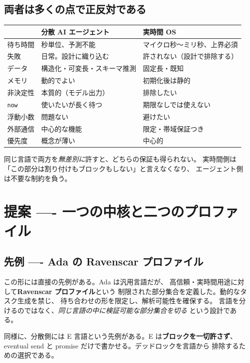 \documentclass[11pt,a4paper]{ltjsarticle}
\theoremstyle{remark}
\begin{document}
\subsection{両者は多くの点で正反対である}

\begin{center}
\small
\begin{tabular}{@{}lll@{}}
\toprule
 & 分散 AI エージェント & 実時間 OS \\
\midrule
待ち時間        & 秒単位、予測不能 & マイクロ秒〜ミリ秒、上界必須 \\
失敗            & 日常。設計に織り込む & 許されない（設計で排除する） \\
データ          & 構造化・可変長・スキーマ推測 & 固定長・既知 \\
メモリ          & 動的でよい & 初期化後は静的 \\
非決定性        & 本質的（モデル出力） & 排除したい \\
\texttt{now}    & 使いたいが長く待つ & 期限なしでは使えない \\
浮動小数        & 問題ない & 避けたい \\
外部通信        & 中心的な機能 & 限定・帯域保証つき \\
優先度          & 概念が薄い & 中心的 \\
\bottomrule
\end{tabular}
\end{center}

同じ言語で両方を\emph{無差別に}許すと、どちらの保証も得られない。
実時間側は「この部分は割り付けもブロックもしない」と言えなくなり、
エージェント側は不要な制約を負う。

\section{提案 ---- 一つの中核と二つのプロファイル}

\subsection{先例 ---- Ada の Ravenscar プロファイル}

この形には直接の先例がある。Ada は汎用言語だが、
高信頼・実時間用途に対して\textbf{Ravenscar プロファイル}という
制限された部分集合を定義した。動的なタスク生成を禁じ、
待ち合わせの形を限定し、解析可能性を確保する。
言語を分けるのではなく、\emph{同じ言語の中に検証可能な部分集合を切る}
という設計である。

同様に、分散側には E 言語という先例がある。E は\textbf{ブロックを一切許さず}、
eventual send と promise だけで書かせる。デッドロックを言語から
排除するための選択である。
\end{document}
